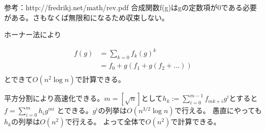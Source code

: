 \documentclass{jsarticle}
\begin{document}
参考：http://fredrikj.net/math/rev.pdf
合成関数f(g)はgの定数項が0である必要がある。さもなくば無限和になるため収束しない。

ホーナー法により

\begin{align}
  f(g)&=\sum_{k=0} f_k(g)^k\\
      &=f_0+g(f_1+g(f_2+\ldots))\\
\end{align}
とできて$O(n^2\log n)$で計算できる。

平方分割により高速化できる。$m=[\sqrt{n}]$として$h_k:=\sum_{i=0}^{m-1} f_{mk+i}g^i$とすると
$f=\sum_{i=0}^m h_i g^{mi}$
とできる。$g^i$の列挙は$O(n^{3/2} \log{n})$で行える。
愚直にやっても$h_k$の列挙は$O(n^{2})$で行える。
よって全体で$O(n^2)$で計算できる。
\end{document}
